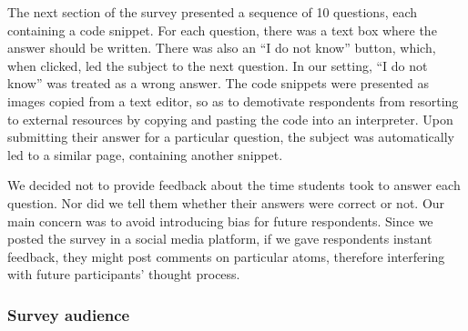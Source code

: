 The next section of the survey presented a sequence of 10 questions, each containing a code snippet. For each question, there was a text box where the answer should be written. There was also an ``I do not know'' button, which, when clicked, led the subject to the next question. In our setting, ``I do not know'' was treated as a wrong answer. The code snippets were presented as images copied from a text editor, so as to demotivate respondents from resorting to external resources by copying and pasting the code into an interpreter. Upon submitting their answer for a particular question, the subject was automatically led to a similar page, containing another snippet.
    
We decided not to provide feedback about the time students took to answer each question. Nor did we tell them whether their answers were correct or not. Our main concern was to avoid introducing bias for future respondents. Since we posted the survey in a social media platform, if we gave respondents instant feedback, they might post comments on particular atoms, therefore interfering with future participants' thought process.



\subsubsection{Survey audience}



